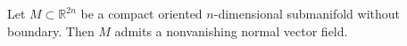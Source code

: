 Let $M \subset \mathbb{R}^{2n}$ be a compact oriented $n$-dimensional submanifold without boundary. Then $M$ admits a nonvanishing normal vector field.
